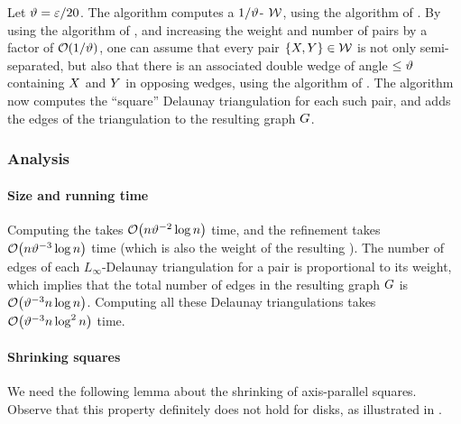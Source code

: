 \documentclass[12pt]{article}%
\begin{document}
Let $\vartheta = \varepsilon/20$.  The algorithm computes a $1/\vartheta$-\SSPD
$\mathcal{W}$, using the algorithm of . By using the
algorithm of , and increasing the weight and number
of pairs by a factor of $\mathcal{O}(1/\vartheta)$, one can assume that every pair
$\{ X, Y \} \in \mathcal{W}$ is not only semi-separated, but also that
there is an associated double wedge of angle $\leq \vartheta$ containing
$X$ and $Y$ in opposing wedges, using the algorithm of
.  The algorithm now computes the ``square''
Delaunay triangulation for each such pair, and adds the edges of the
triangulation to the resulting graph $G$.



\subsubsection{Analysis}

\paragraph{Size and running time}

Computing the \SSPD takes $\Of\pth{n \epsA^{-2} \log n}$ time, and the
refinement takes $\Of\pth{n \epsA^{-3} \log n}$ time (which is also
the weight of the resulting \SSPD). The number of edges of each
$L_\infty$-Delaunay triangulation for a pair is proportional to its
weight, which implies that the total number of edges in the resulting
graph $G$ is $\Of\pth{ \epsA^{-3} n\log n}$. Computing all these
Delaunay triangulations takes $\Of\pth{ \epsA^{-3}n \log^2 n}$ time.


\paragraph{Shrinking squares}
We need the following lemma about the shrinking of axis-parallel
squares.  Observe that this property definitely does not hold for
disks, as illustrated in .
\end{document}
